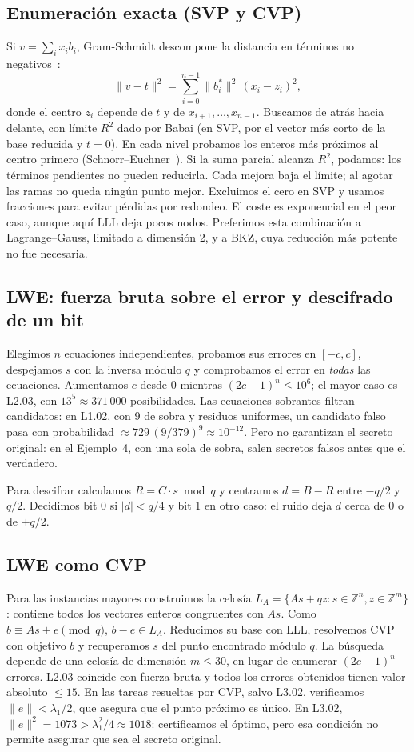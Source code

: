 \subsection{Enumeración exacta (SVP y CVP)}
Si $v=\sum_i x_ib_i$, Gram-Schmidt descompone la distancia en términos no negativos~\cite{galbraith}:
\[
 \|v-t\|^2=\sum_{i=0}^{n-1}\|b_i^*\|^2\,(x_i-z_i)^2 ,
\]
donde el centro $z_i$ depende de $t$ y de $x_{i+1},\dots,x_{n-1}$. Buscamos de atrás hacia delante,
con límite $R^2$ dado por Babai (en SVP, por el vector más corto de la base reducida y $t=0$).
En cada nivel probamos los enteros más próximos al centro primero
(Schnorr--Euchner~\cite{se}). Si la suma parcial alcanza $R^2$, podamos: los términos pendientes
no pueden reducirla. Cada mejora baja el límite; al agotar las ramas no queda ningún punto mejor.
Excluimos el cero en SVP y usamos fracciones para evitar pérdidas por redondeo. El coste es
exponencial en el peor caso, aunque aquí LLL deja pocos nodos. Preferimos esta combinación a
Lagrange--Gauss, limitado a dimensión 2, y a BKZ, cuya reducción más potente no fue necesaria.

\subsection{LWE: fuerza bruta sobre el error y descifrado de un bit}
Elegimos $n$ ecuaciones independientes, probamos sus errores en $[-c,c]$, despejamos $s$ con
la inversa módulo $q$ y comprobamos el error en \emph{todas} las ecuaciones. Aumentamos $c$ desde
0 mientras $(2c+1)^n\le10^6$; el mayor caso es L2.03, con $13^5\approx371\,000$ posibilidades.
Las ecuaciones sobrantes filtran candidatos: en L1.02, con 9 de sobra y residuos uniformes, un
candidato falso pasa con probabilidad $\approx729\,(9/379)^9\approx10^{-12}$. Pero no garantizan
el secreto original: en el Ejemplo~4, con una sola de sobra, salen secretos falsos antes que el verdadero.

Para descifrar calculamos $R=C\cdot s\bmod q$ y centramos $d=B-R$ entre $-q/2$ y $q/2$.
Decidimos bit 0 si $|d|<q/4$ y bit 1 en otro caso: el ruido deja $d$ cerca de 0 o de $\pm q/2$.

\subsection{LWE como CVP}
\label{sec:lwecvp}
Para las instancias mayores construimos la celosía
$L_A=\{As+qz:s\in\mathbb Z^n,z\in\mathbb Z^m\}$: contiene todos los vectores enteros
congruentes con $As$. Como $b\equiv As+e\pmod q$, $b-e\in L_A$. Reducimos su base con LLL,
resolvemos CVP con objetivo $b$ y recuperamos $s$ del punto encontrado módulo $q$.
La búsqueda depende de una celosía de dimensión $m\le30$, en lugar de enumerar $(2c+1)^n$ errores.
L2.03 coincide con fuerza bruta y todos los errores obtenidos tienen valor absoluto $\le15$.
En las tareas resueltas por CVP, salvo L3.02, verificamos $\|e\|<\lambda_1/2$, que asegura que
el punto próximo es único. En L3.02, $\|e\|^2=1073>\lambda_1^2/4\approx1018$: certificamos el
óptimo, pero esa condición no permite asegurar que sea el secreto original.

